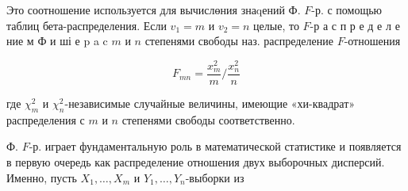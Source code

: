 \documentclass[10pt]{article}
\begin{document}
Это соотношение используется для вычислөния знаqений Ф. $F$-р. с помощью таблиц бета-распределения. Если $v_{1}=m$ и $v_{2}=n$ целые, то $F$-р а с п р е д е л е ние м Ф и ші е p a c $m$ и $n$ степенями свободы наз. распределение $F$-отношения



\[

F_{m n}=\frac{x_{m}^{2}}{m} / \frac{x_{n}^{2}}{n}

\]



где $\chi_{m}^{2}$ и $\chi_{n}^{2}$-независимые случайные величины, имеющие «хи-квадрат» распределения с $m$ и $n$ степенями свободы соответственно.



Ф. $F$-р. играет фундаментальную роль в математической статистике и появляется в первую очередь как распределение отношения двух выборочных дисперсий. Именно, пусть $X_{1}, \ldots, X_{m}$ и $Y_{1}, \ldots, Y_{n}$-выборки из
\end{document}
